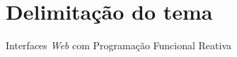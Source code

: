 \section{Delimitação do tema}\label{ldelimitacao}

Interfaces \textit{Web} com Programação Funcional Reativa

